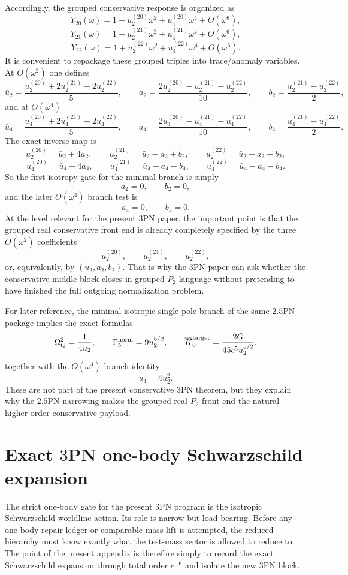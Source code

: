 \documentclass[11pt]{article}
\begin{document}
Accordingly, the grouped conservative response is organized as
\[
Y_{20}(\omega)=1+u_2^{(20)}\omega^2+u_4^{(20)}\omega^4+O(\omega^6),
\]
\[
Y_{21}(\omega)=1+u_2^{(21)}\omega^2+u_4^{(21)}\omega^4+O(\omega^6),
\]
\[
Y_{22}(\omega)=1+u_2^{(22)}\omega^2+u_4^{(22)}\omega^4+O(\omega^6).
\]
It is convenient to repackage these grouped triples into trace/anomaly variables.
 At $O(\omega^2)$ one defines
\[
\bar u_2=\frac{u_2^{(20)}+2u_2^{(21)}+2u_2^{(22)}}{5},
\qquad
a_2=\frac{2u_2^{(20)}-u_2^{(21)}-u_2^{(22)}}{10},
\qquad
b_2=\frac{u_2^{(21)}-u_2^{(22)}}{2},
\]
and at $O(\omega^4)$
\[
\bar u_4=\frac{u_4^{(20)}+2u_4^{(21)}+2u_4^{(22)}}{5},
\qquad
a_4=\frac{2u_4^{(20)}-u_4^{(21)}-u_4^{(22)}}{10},
\qquad
b_4=\frac{u_4^{(21)}-u_4^{(22)}}{2}.
\]
The exact inverse map is
\[
u_2^{(20)}=\bar u_2+4a_2,
\qquad
u_2^{(21)}=\bar u_2-a_2+b_2,
\qquad
u_2^{(22)}=\bar u_2-a_2-b_2,
\]
\[
u_4^{(20)}=\bar u_4+4a_4,
\qquad
u_4^{(21)}=\bar u_4-a_4+b_4,
\qquad
u_4^{(22)}=\bar u_4-a_4-b_4.
\]
So the first isotropy gate for the minimal branch is simply
\[
a_2=0,
\qquad
b_2=0,
\]
and the later $O(\omega^4)$ branch test is
\[
a_4=0,
\qquad
b_4=0.
\]
At the level relevant for the present $3$PN paper, the important point is that
 the grouped real conservative front end is already completely specified by the
 three $O(\omega^2)$ coefficients
\[
u_2^{(20)},\qquad u_2^{(21)},\qquad u_2^{(22)},
\]
or, equivalently, by $(\bar u_2,a_2,b_2)$.  That is why the $3$PN paper can ask
 whether the conservative middle block closes in grouped-$P_2$ language without
 pretending to have finished the full outgoing normalization problem.

For later reference, the minimal isotropic single-pole branch of the same $2.5$PN
 package implies the exact formulas
\[
\Omega_Q^2=\frac{1}{4u_2},
\qquad
\Gamma_5^{\rm norm}=9u_2^{5/2},
\qquad
\overline K_0^{\rm target}=\frac{2G}{45c^5u_2^{5/2}},
\]
together with the $O(\omega^4)$ branch identity
\[
u_4=4u_2^2.
\]
These are not part of the present conservative $3$PN theorem, but they explain
 why the $2.5$PN narrowing makes the grouped real $P_2$ front end the natural
 higher-order conservative payload.


\section{Exact \texorpdfstring{$3$}{3}PN one-body Schwarzschild expansion}
\label{app:onebody-expansion}

The strict one-body gate for the present $3$PN program is the isotropic
Schwarzschild worldline action. Its role is narrow but load-bearing. Before any
one-body repair ledger or comparable-mass lift is attempted, the reduced
hierarchy must know exactly what the test-mass sector is allowed to reduce to.
The point of the present appendix is therefore simply to record the exact
Schwarzschild expansion through total order $c^{-6}$ and isolate the new $3$PN
block.
\end{document}
